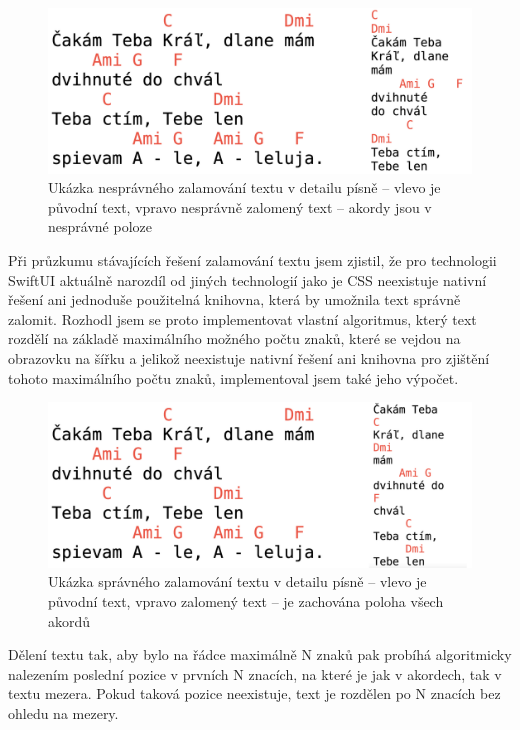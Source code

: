 \begin{figure}[H]
    \includegraphics[width=\textwidth]{images/5-implementace/5-4-spatne-zalomeni.png}
    \caption[Ukázka nesprávného zalamování textu v detailu písně]{Ukázka nesprávného zalamování textu v detailu písně -- vlevo je původní text, vpravo nesprávně zalomený text -- akordy jsou v nesprávné poloze}
\end{figure}

Při průzkumu stávajících řešení zalamování textu jsem zjistil, že pro technologii SwiftUI aktuálně narozdíl od jiných technologií jako je CSS neexistuje nativní řešení ani jednoduše použitelná knihovna, která by umožnila text správně zalomit. Rozhodl jsem se proto implementovat vlastní algoritmus, který text rozdělí na základě maximálního možného počtu znaků, které se vejdou na obrazovku na šířku a jelikož neexistuje nativní řešení ani knihovna pro zjištění tohoto maximálního počtu znaků, implementoval jsem také jeho výpočet.

\begin{figure}[H]
    \includegraphics[width=\textwidth]{images/5-implementace/5-5-spravne-zalomeni.png}
    \caption[Ukázka správného zalamování textu v detailu písně]{Ukázka správného zalamování textu v detailu písně -- vlevo je původní text, vpravo zalomený text -- je zachována poloha všech akordů}
\end{figure}

Dělení textu tak, aby bylo na řádce maximálně N znaků pak probíhá algoritmicky nalezením poslední pozice v prvních N znacích, na které je jak v akordech, tak v textu mezera. Pokud taková pozice neexistuje, text je rozdělen po N znacích bez ohledu na mezery.

